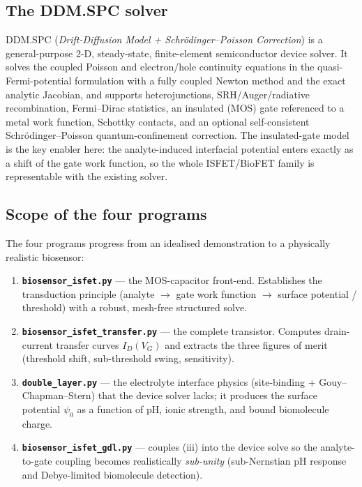 \documentclass[11pt,a4paper]{article}
\newcommand{\code}[1]{\texttt{#1}}
\begin{document}
\subsection{The DDM.SPC solver}
DDM.SPC (\emph{Drift-Diffusion Model + Schr\"odinger--Poisson Correction}) is a
general-purpose 2-D, steady-state, finite-element semiconductor device solver.
It solves the coupled Poisson and electron/hole continuity equations in the
quasi-Fermi-potential formulation with a fully coupled Newton method and the
exact analytic Jacobian, and supports heterojunctions, SRH/Auger/radiative
recombination, Fermi--Dirac statistics, an insulated (MOS) gate referenced to a
metal work function, Schottky contacts, and an optional self-consistent
Schr\"odinger--Poisson quantum-confinement correction. The insulated-gate model
is the key enabler here: the analyte-induced interfacial potential enters exactly
as a shift of the gate work function, so the whole ISFET/BioFET family is
representable with the existing solver.

\subsection{Scope of the four programs}
The four programs progress from an idealised demonstration to a physically
realistic biosensor:
\begin{enumerate}
  \item \textbf{\code{biosensor\_isfet.py}} --- the MOS-capacitor front-end.
  Establishes the transduction principle (analyte $\to$ gate work function $\to$
  surface potential / threshold) with a robust, mesh-free structured solve.
  \item \textbf{\code{biosensor\_isfet\_transfer.py}} --- the complete transistor.
  Computes drain-current transfer curves $I_D(V_G)$ and extracts the three
  figures of merit (threshold shift, sub-threshold swing, sensitivity).
  \item \textbf{\code{double\_layer.py}} --- the electrolyte interface physics
  (site-binding + Gouy--Chapman--Stern) that the device solver lacks; it produces
  the surface potential $\psi_0$ as a function of pH, ionic strength, and bound
  biomolecule charge.
  \item \textbf{\code{biosensor\_isfet\_gdl.py}} --- couples (iii) into the device
  solve so the analyte-to-gate coupling becomes realistically \emph{sub-unity}
  (sub-Nernstian pH response and Debye-limited biomolecule detection).
\end{enumerate}
\end{document}
